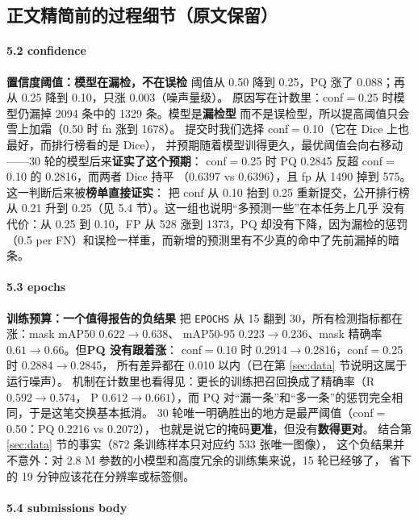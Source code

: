 \documentclass{article}
\begin{document}
\subsection{正文精简前的过程细节（原文保留）}

\paragraph{5.2 confidence}
\textbf{置信度阈值：模型在漏检，不在误检}
阈值从 0.50 降到 0.25，PQ 涨了 0.088；再从 0.25 降到 0.10，只涨 0.003（噪声量级）。
原因写在计数里：conf$=$0.25 时模型仍漏掉 2094 条中的 1329 条。模型是\textbf{漏检型}
而不是误检型，所以提高阈值只会雪上加霜（0.50 时 fn 涨到 1678）。
提交时我们选择 conf$=$0.10（它在 Dice 上也最好，而排行榜看的是 Dice），
并预期随着模型训得更久，最优阈值会向右移动——30 轮的模型后来\textbf{证实了这个预期}：
conf$=$0.25 时 PQ 0.2845 反超 conf$=$0.10 的 0.2816，而两者 Dice 持平
（0.6397 vs 0.6396），且 fp 从 1490 掉到 575。这一判断后来被\textbf{榜单直接证实}：
把 conf 从 0.10 抬到 0.25 重新提交，公开排行榜从 0.21 升到 0.25（见 5.4 节）。这一组也说明“多预测一些”在本任务上几乎
没有代价：从 0.25 到 0.10，FP 从 528 涨到 1373，PQ 却没有下降，因为漏检的惩罚
（0.5 per FN）和误检一样重，而新增的预测里有不少真的命中了先前漏掉的暗条。

\paragraph{5.3 epochs}
\textbf{训练预算：一个值得报告的负结果}
把 \texttt{EPOCHS} 从 15 翻到 30，所有检测指标都在涨：mask mAP50 $0.622\to0.638$、
mAP50-95 $0.223\to0.236$、mask 精确率 $0.61\to0.66$。但\textbf{PQ 没有跟着涨}：
conf$=$0.10 时 0.2914$\to$0.2816，conf$=$0.25 时 0.2884$\to$0.2845，
所有差异都在 0.010 以内（已在第 \ref{sec:data} 节说明这属于运行噪声）。
机制在计数里也看得见：更长的训练把召回换成了精确率（R $0.592\to0.574$，
P $0.612\to0.661$），而 PQ 对“漏一条”和“多一条”的惩罚完全相同，于是这笔交换基本抵消。
30 轮唯一明确胜出的地方是最严阈值（conf$=$0.50：PQ 0.2216 vs 0.2072），
也就是说它的掩码\textbf{更准}，但没有\textbf{数得更对}。
结合第 \ref{sec:data} 节的事实（872 条训练样本只对应约 533 张唯一图像），
这个负结果并不意外：对 2.8 M 参数的小模型和高度冗余的训练集来说，15 轮已经够了，
省下的 19 分钟应该花在分辨率或标签侧。

\paragraph{5.4 submissions body}
\end{document}
